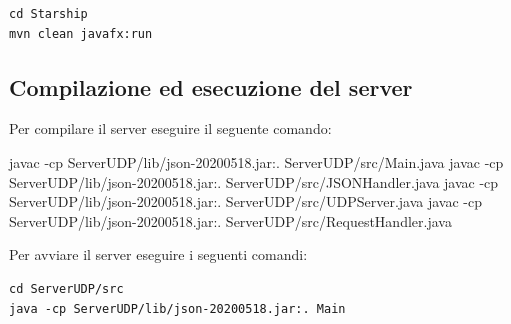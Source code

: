 \documentclass{article}
\newenvironment{commandbox}{%
  \begin{tcolorbox}[colback=white,colframe=black!50!white,sharp corners,width=\textwidth]%
  \ttfamily
}{%
  \end{tcolorbox}%
}
\begin{document}
\begin{commandbox}
\begin{verbatim}
cd Starship
mvn clean javafx:run
\end{verbatim}
\end{commandbox}

\subsection{Compilazione ed esecuzione del server}

Per compilare il server eseguire il seguente comando:
\begin{commandbox}
javac -cp ServerUDP/lib/json-20200518.jar:. ServerUDP/src/Main.java\newline
javac -cp ServerUDP/lib/json-20200518.jar:. ServerUDP/src/JSONHandler.java \newline
javac -cp ServerUDP/lib/json-20200518.jar:. ServerUDP/src/UDPServer.java \newline
javac -cp ServerUDP/lib/json-20200518.jar:. ServerUDP/src/RequestHandler.java
\end{commandbox}

Per avviare il server eseguire i seguenti comandi:
\begin{commandbox}
\begin{verbatim}
cd ServerUDP/src
java -cp ServerUDP/lib/json-20200518.jar:. Main
\end{verbatim}
\end{commandbox}



\clearpage
\end{document}
